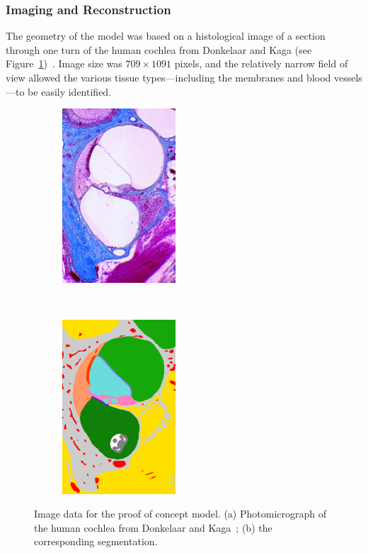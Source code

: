 \subsubsection{Imaging and Reconstruction}

The geometry of the model was based on a histological image of a section through
one turn of the human cochlea from Donkelaar and Kaga (see
Figure~\ref{fig:poc_histology})~\cite{donkelaar2011}. Image size was $ 709
\times 1091 $ pixels, and the relatively narrow field of view allowed the
various tissue types---including the membranes and blood vessels---to be easily
identified.

\begin{figure}
	\centering
	
	\begin{subfigure}[t]{0.35\textwidth}
        \centering
        \includegraphics[height=6.5cm]{Methodology/donkelaar_histo}
        \caption{ }
        \label{fig:poc_histology}
    \end{subfigure}%
    ~~~~
    \begin{subfigure}[t]{0.35\textwidth}
        \centering
        \includegraphics[height=6.5cm]{Methodology/donkelaar_segmented}
        \caption{ }
        \label{fig:poc_segmentation}
    \end{subfigure}%
    
	\caption[Image data for the proof of concept model]{Image data for the proof of
	concept model. (a) Photomicrograph of the human cochlea from Donkelaar and
	Kaga~\cite{donkelaar2011}; (b) the corresponding segmentation.}
	\label{fig:poc_model}
\end{figure}


